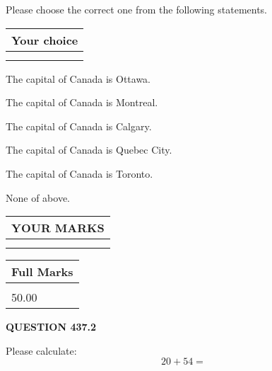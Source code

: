 \documentclass[12pt]{article}
\begin{document}
  
Please choose the correct one from the following statements.
  
  
\noindent\hspace{3.0in} \begin{tabular}{|l|}
\hline
Your choice \\
\hline
 \\ 
 \\ 
\hline
\end{tabular}
  
  
 
 
The capital of Canada is Ottawa.
 
 
The capital of Canada is Montreal.
 
 
The capital of Canada is Calgary.
 
 
The capital of Canada is Quebec City.
 
 
The capital of Canada is Toronto.
 
 
 None of above.
 
 
  
\vspace{0.2in}
  
\noindent\begin{tabular}{|l|}
\hline
 YOUR MARKS  \\
\hline
 \\ 
 \\ 
\hline
\end{tabular}
\hspace{0.05in} \begin{tabular}{|l|}
\hline
 Full Marks  \\
\hline
 \\ 
50.00 \\
\hline
\end{tabular}
{\textbf{\Large{QUESTION
437.2 
}}}
  
  
 
Please calculate:
\begin{equation}
20 +  %
54 = \nonumber
\end{equation}
 

 

 
   
   
 \vspace{0.2in}
 
   
   
   
   
\end{document}
